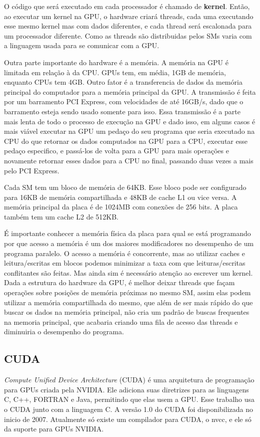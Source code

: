 O código que será executado em cada processador é chamado de \textbf{kernel}. Então, ao executar um kernel na GPU, o 
hardware criará threads, cada uma executando esse mesmo kernel mas com dados diferentes, e cada thread será escalonada 
para um processador diferente. Como as threads são distribuidas pelos SMs varia com a linguagem usada para se comunicar com a GPU.

Outra parte importante do hardware é a memória. A memória na GPU é limitada em relação à da CPU. GPUs tem, em média, 1GB
de memória, enquanto CPUs tem 4GB. Outro fator é a transferencia de dados da memória principal do computador para a memória 
principal da GPU. A transmissão é feita por um barramento PCI Express, com velocidades de até 16GB/s, dado que o
barramento esteja sendo usado somente para isso. Essa transmissão é a parte mais lenta de todo o
processo de execução na GPU e dado isso, em alguns casos é mais viável executar na GPU um pedaço do seu programa que seria executado
na CPU do que retornar os dados computados na GPU para a CPU, executar esse pedaço especifico, e passá-los de volta para a GPU 
para mais operações e novamente retornar esses dados para a CPU no final, passando duas vezes a mais pelo PCI Express. 

Cada SM tem um bloco de memória de 64KB. Esse bloco pode ser configurado para 16KB de memória compartilhada e 48KB
de cache L1 ou vice versa. A memória principal da placa é de 1024MB com conexões de 256 bits. A placa também tem um
cache L2 de 512KB.

É importante conhecer a memória física da placa para qual se está programando por que acesso a memória é um dos maiores
modificadores no desempenho de um programa paralelo. O acesso a memória é concorrente, mas ao utilizar caches e leitura/escritas em
blocos podemos minimizar a taxa com que leituras/escritas conflitantes são feitas. Mas ainda sim é necessário atenção ao escrever um
kernel. Dada a estrutura do hardware da GPU, é melhor deixar threads que façam operações sobre posições de memória próximas no mesmo
SM, assim elas podem utilizar a memória compartilhada do mesmo, que além de ser mais rápido do que buscar os dados na memória principal,
não cria um padrão de buscas frequentes na memoria principal, que acabaria criando uma fila de acesso das threads e diminuiria o desempenho
do programa.

\subsection{CUDA}
\textit{Compute Unified Device Architecture} (CUDA) é uma arquitetura de programação para GPUs criada pela NVIDIA.
Ele adiciona suas diretrizes para as linguagens C, C++, FORTRAN e Java, permitindo que elas usem a GPU.
Esse trabalho usa o CUDA junto com a linguagem C.
A versão 1.0 do CUDA foi disponibilizada no inicio de 2007. Atualmente só existe um compilador para CUDA, o nvcc,
e ele só da suporte para GPUs NVIDIA.


